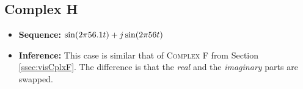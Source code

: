 \documentclass[../../course]{subfiles}
\begin{document}
\subsection{Complex H} \label{ssec:visCplxH}

\begin{itemize} [label=]

    \item \textbf{Sequence:} $\sin(2 \pi 56.1 t) + j \sin(2 \pi 56 t)$

    \item \textbf{Inference:} This case is similar that of \textsc{Complex F} from Section
        \ref{ssec:visCplxF}. The difference is that the \emph{real} and the \emph{imaginary}
        parts are swapped.

\end{itemize}

\vfill
\end{document}

